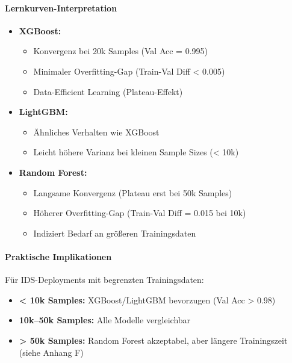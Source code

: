 \documentclass[11pt,a4paper]{article}
\begin{document}
    \paragraph{Lernkurven-Interpretation}
    \begin{itemize}
        \item \textbf{XGBoost:}
        \begin{itemize}
            \item Konvergenz bei 20k Samples (Val Acc = 0.995)
            \item Minimaler Overfitting-Gap (Train-Val Diff < 0.005)
            \item Data-Efficient Learning (Plateau-Effekt)
        \end{itemize}
        \item \textbf{LightGBM:}
        \begin{itemize}
            \item Ähnliches Verhalten wie XGBoost
            \item Leicht höhere Varianz bei kleinen Sample Sizes (< 10k)
        \end{itemize}
        \item \textbf{Random Forest:}
        \begin{itemize}
            \item Langsame Konvergenz (Plateau erst bei 50k Samples)
            \item Höherer Overfitting-Gap (Train-Val Diff = 0.015 bei 10k)
            \item Indiziert Bedarf an größeren Trainingsdaten
        \end{itemize}
    \end{itemize}

    \paragraph{Praktische Implikationen}
    Für IDS-Deployments mit begrenzten Trainingsdaten:
    \begin{itemize}
        \item \textbf{< 10k Samples:} XGBoost/LightGBM bevorzugen
        (Val Acc > 0.98)
        \item \textbf{10k--50k Samples:} Alle Modelle vergleichbar
        \item \textbf{> 50k Samples:} Random Forest akzeptabel,
        aber längere Trainingszeit (siehe Anhang F)
    \end{itemize}
\end{document}

